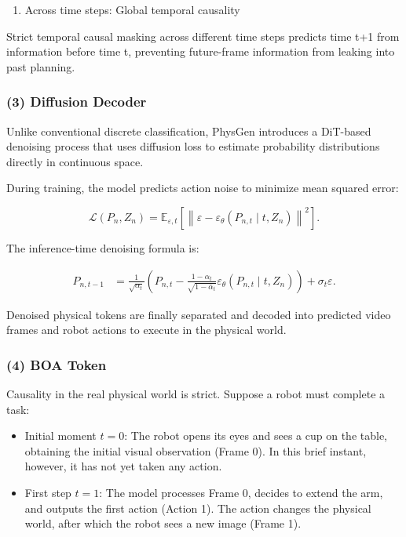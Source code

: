\begin{enumerate}
\def\labelenumi{\arabic{enumi}.}
\setcounter{enumi}{3}
\tightlist
\item
  Across time steps: Global temporal causality
\end{enumerate}

Strict temporal causal masking across different time steps predicts time t+1 from information before time t, preventing future-frame information from leaking into past planning.

\hypertarget{diffusion-decoder}{%
\subsubsection{(3) Diffusion Decoder}\label{diffusion-decoder}}

Unlike conventional discrete classification, PhysGen introduces a DiT-based denoising process that uses diffusion loss to estimate probability distributions directly in continuous space.

During training, the model predicts action noise to minimize mean squared error:

\[
\mathcal{L}(P_n,Z_n)=\mathbb{E}_{\varepsilon,t}\left[\left\|\varepsilon-\varepsilon_\theta(P_{n,t}\mid t,Z_n)\right\|^2\right].
\]

The inference-time denoising formula is:

\[
\begin{aligned}
P_{n,t-1}
&=\frac{1}{\sqrt{\alpha_t}}
\left(
P_{n,t}-\frac{1-\alpha_t}{\sqrt{1-\bar{\alpha}_t}}
\varepsilon_\theta(P_{n,t}\mid t,Z_n)
\right)
+\sigma_t\varepsilon.
\end{aligned}
\]

Denoised physical tokens are finally separated and decoded into predicted video frames and robot actions to execute in the physical world.

\hypertarget{boa-token}{%
\subsubsection{(4) BOA Token}\label{boa-token}}

Causality in the real physical world is strict. Suppose a robot must complete a task:

\begin{itemize}
\tightlist
\item
  Initial moment \(t=0\): The robot opens its eyes and sees a cup on the table, obtaining the initial visual observation (Frame 0). In this brief instant, however, it has not yet taken any action.
\item
  First step \(t=1\): The model processes Frame 0, decides to extend the arm, and outputs the first action (Action 1). The action changes the physical world, after which the robot sees a new image (Frame 1).
\end{itemize}

